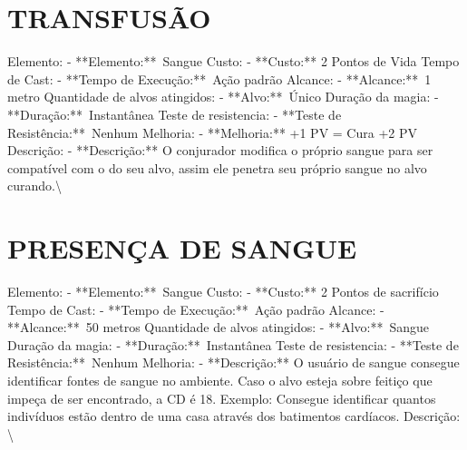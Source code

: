 \documentclass{article}%
\begin{document}
%
\normalsize%
\section{TRANSFUSÃO}%
\label{sec:TRANSFUSO}%
Elemento: {-} **Elemento:**~Sangue\newline%
Custo: {-} **Custo:** 2 Pontos de Vida\newline%
Tempo de Cast: {-} **Tempo de Execução:**~Ação padrão\newline%
Alcance: {-} **Alcance:**~1 metro\newline%
Quantidade de alvos atingidos: {-} **Alvo:**~Único\newline%
Duração da magia: {-} **Duração:**~Instantânea\newline%
Teste de resistencia: {-} **Teste de Resistência:**~Nenhum\newline%
Melhoria: {-} **Melhoria:** +1 PV = Cura +2 PV\newline%
Descrição: {-} **Descrição:** O conjurador modifica o próprio sangue para ser compatível com o do seu alvo, assim ele penetra seu próprio sangue no alvo curando.\textbackslash{}

%
\section{PRESENÇA DE SANGUE}%
\label{sec:PRESENADESANGUE}%
Elemento: {-} **Elemento:**~Sangue\newline%
Custo: {-} **Custo:** 2 Pontos de sacrifício\newline%
Tempo de Cast: {-} **Tempo de Execução:**~Ação padrão\newline%
Alcance: {-} **Alcance:**~50 metros\newline%
Quantidade de alvos atingidos: {-} **Alvo:**~Sangue\newline%
Duração da magia: {-} **Duração:**~Instantânea\newline%
Teste de resistencia: {-} **Teste de Resistência:**~Nenhum\newline%
Melhoria: {-} **Descrição:** O usuário de sangue consegue identificar fontes de sangue no ambiente. Caso o alvo esteja sobre feitiço que impeça de ser encontrado, a CD é 18. Exemplo: Consegue identificar quantos indivíduos estão dentro de uma casa através dos batimentos cardíacos.\newline%
Descrição: \textbackslash{}

%
\end{document}
